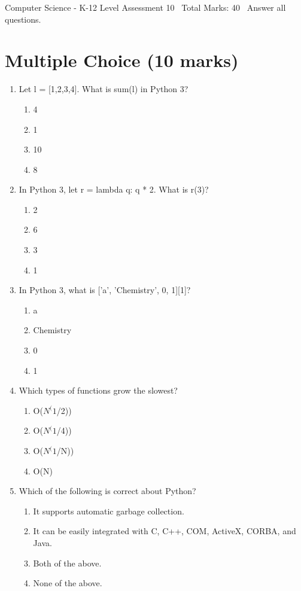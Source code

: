 \documentclass[12pt]{article}
\begin{document}
\begin{center}
Computer Science - K-12 Level Assessment 10 \
Total Marks: 40 \
Answer all questions.
\end{center}

\section*{Multiple Choice (10 marks)}
\begin{enumerate}[label=\arabic*.]
\item Let l = [1,2,3,4]. What is sum(l) in Python 3?
\begin{enumerate}[label=(\alph*)]
    \item 4
    \item 1
    \item 10
    \item 8
\end{enumerate}
\item In Python 3, let r = lambda q: q * 2. What is r(3)?
\begin{enumerate}[label=(\alph*)]
    \item 2
    \item 6
    \item 3
    \item 1
\end{enumerate}
\item In Python 3, what is ['a', 'Chemistry', 0, 1][1]?
\begin{enumerate}[label=(\alph*)]
    \item a
    \item Chemistry
    \item 0
    \item 1
\end{enumerate}
\item Which types of functions grow the slowest?
\begin{enumerate}[label=(\alph*)]
    \item O($N^(1$/2))
    \item O($N^(1$/4))
    \item O($N^(1$/N))
    \item O(N)
\end{enumerate}
\item Which of the following is correct about Python?
\begin{enumerate}[label=(\alph*)]
    \item It supports automatic garbage collection.
    \item It can be easily integrated with C, C++, COM, ActiveX, CORBA, and Java.
    \item Both of the above.
    \item None of the above.
\end{enumerate}
\end{enumerate}
\end{document}
